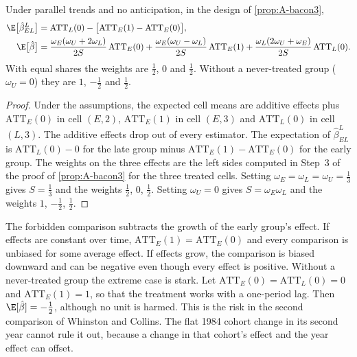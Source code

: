 \begin{corollary}\label{cor:A-bacon3}
Under parallel trends and no anticipation, in the design of \cref{prop:A-bacon3},
\begin{align*}
\E\big[\hat\beta^{L}_{EL}\big]&=\mathrm{ATT}_L(0)-\big[\mathrm{ATT}_E(1)-\mathrm{ATT}_E(0)\big],\\
\E\big[\hat\beta\big]&=\frac{\omega_E(\omega_U+2\omega_L)}{2S}\,\mathrm{ATT}_E(0)
+\frac{\omega_E(\omega_U-\omega_L)}{2S}\,\mathrm{ATT}_E(1)+\frac{\omega_L(2\omega_U+\omega_E)}{2S}\,\mathrm{ATT}_L(0).
\end{align*}
With equal shares the weights are $\frac{1}{2}$, $0$ and $\frac{1}{2}$. Without a never-treated group
($\omega_U=0$) they are $1$, $-\frac{1}{2}$ and $\frac{1}{2}$.
\end{corollary}

\begin{proof}
Under the assumptions, the expected cell means are additive effects plus $\mathrm{ATT}_E(0)$ in cell $(E,2)$,
$\mathrm{ATT}_E(1)$ in cell $(E,3)$ and $\mathrm{ATT}_L(0)$ in cell $(L,3)$. The additive effects drop out of every
estimator. The expectation of $\hat\beta^{L}_{EL}$ is $\mathrm{ATT}_L(0)-0$ for the late group minus
$\mathrm{ATT}_E(1)-\mathrm{ATT}_E(0)$ for the early group. The weights on the three effects are the left sides
computed in Step~3 of the proof of \cref{prop:A-bacon3} for the three treated cells. Setting
$\omega_E=\omega_L=\omega_U=\frac{1}{3}$ gives $S=\frac{1}{3}$ and the weights $\frac{1}{2}$, $0$, $\frac{1}{2}$.
Setting $\omega_U=0$ gives $S=\omega_E\omega_L$ and the weights $1$, $-\frac{1}{2}$, $\frac{1}{2}$.
\end{proof}

The forbidden comparison subtracts the growth of the early group's effect. If effects are constant over time,
$\mathrm{ATT}_E(1)=\mathrm{ATT}_E(0)$ and every comparison is unbiased for some average effect. If effects grow, the
comparison is biased downward and can be negative even though every effect is positive. Without a never-treated group
the extreme case is stark. Let $\mathrm{ATT}_E(0)=\mathrm{ATT}_L(0)=0$ and $\mathrm{ATT}_E(1)=1$, so that the
treatment works with a one-period lag. Then $\E[\hat\beta]=-\frac{1}{2}$, although no unit is harmed. This is the
risk in the second comparison of Whinston and Collins. The flat 1984 cohort change in its second year cannot rule it
out, because a change in that cohort's effect and the year effect can offset.

